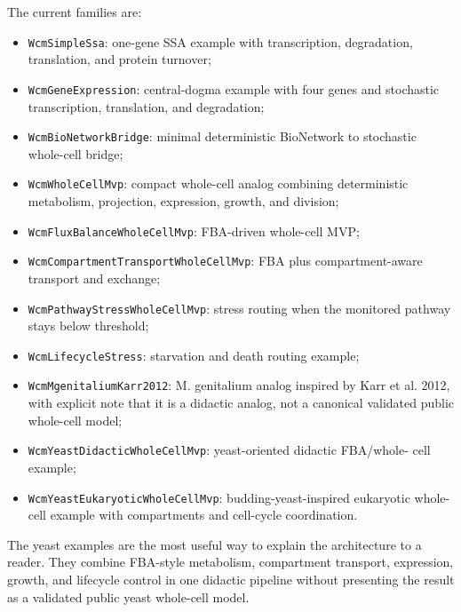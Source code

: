 The current families are:
\begin{itemize}
\item \texttt{WcmSimpleSsa}: one-gene SSA example with transcription,
      degradation, translation, and protein turnover;
\item \texttt{WcmGeneExpression}: central-dogma example with four genes and
      stochastic transcription, translation, and degradation;
\item \texttt{WcmBioNetworkBridge}: minimal deterministic BioNetwork to
      stochastic whole-cell bridge;
\item \texttt{WcmWholeCellMvp}: compact whole-cell analog combining
      deterministic metabolism, projection, expression, growth, and division;
\item \texttt{WcmFluxBalanceWholeCellMvp}: FBA-driven whole-cell MVP;
\item \texttt{WcmCompartmentTransportWholeCellMvp}: FBA plus compartment-aware
      transport and exchange;
\item \texttt{WcmPathwayStressWholeCellMvp}: stress routing when the monitored
      pathway stays below threshold;
\item \texttt{WcmLifecycleStress}: starvation and death routing example;
\item \texttt{WcmMgenitaliumKarr2012}: M. genitalium analog inspired by Karr et
      al. 2012, with explicit note that it is a didactic analog, not a canonical
      validated public whole-cell model;
\item \texttt{WcmYeastDidacticWholeCellMvp}: yeast-oriented didactic FBA/whole-
      cell example;
\item \texttt{WcmYeastEukaryoticWholeCellMvp}: budding-yeast-inspired eukaryotic
      whole-cell example with compartments and cell-cycle coordination.
\end{itemize}

The yeast examples are the most useful way to explain the architecture to a
reader. They combine FBA-style metabolism, compartment transport, expression,
growth, and lifecycle control in one didactic pipeline without presenting the
result as a validated public yeast whole-cell model.

